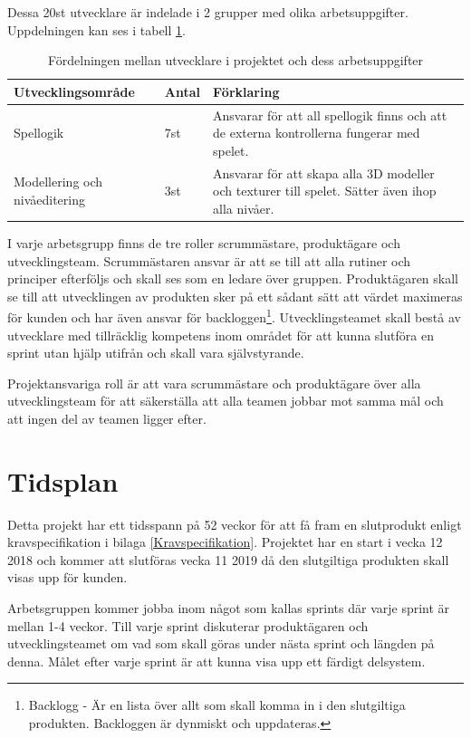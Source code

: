 \documentclass[a4paper,12pt,oneside,final]{extbook}
\begin{document}
Dessa 20st utvecklare är indelade i 2 grupper med olika arbetsuppgifter. Uppdelningen kan ses i tabell \ref{Utvecklare}.
\begin{table}[h]
	\centering
	\caption{Fördelningen mellan utvecklare i projektet och dess arbetsuppgifter}
	\label{Utvecklare}
	\begin{tabular}{ | p{10em} | m{3em} |p{23em}| } 
		\hline
		\textbf{Utvecklingsområde}&\textbf{Antal}  &\textbf{ Förklaring} \\ 
		\hline
		Spellogik &7st & Ansvarar för att all spellogik finns och att de externa kontrollerna fungerar med spelet. \\ 
		\hline
		Modellering och nivåeditering &3st & Ansvarar för att skapa alla 3D modeller och texturer till spelet. Sätter även ihop alla nivåer.  \\ 
		\hline
	
	\end{tabular}
\end{table}

I varje arbetsgrupp finns de tre roller scrummästare, produktägare och utvecklingsteam. Scrummästaren ansvar är att se till att alla rutiner och principer efterföljs och skall ses som en ledare över gruppen. Produktägaren skall se till att utvecklingen av produkten sker på ett sådant sätt att värdet maximeras för kunden och har även ansvar för backloggen\footnote{Backlogg - Är en lista över allt som skall komma in i den slutgiltiga produkten. Backloggen är dynmiskt och uppdateras. }. Utvecklingsteamet skall bestå av utvecklare med tillräcklig kompetens inom området för att kunna slutföra en sprint utan hjälp utifrån och skall vara självstyrande\cite{Scrumguiden}. 


Projektansvariga roll är att vara scrummästare och produktägare över alla utvecklingsteam för att säkerställa att alla teamen jobbar mot samma mål och att ingen del av teamen ligger efter.

\section{Tidsplan}
Detta projekt har ett tidsspann på 52 veckor för att få fram en slutprodukt enligt kravspecifikation i bilaga \ref{Kravspecifikation}. Projektet har en start i vecka 12 2018 och kommer att slutföras vecka 11 2019 då den slutgiltiga produkten skall visas upp för kunden. 

Arbetsgruppen kommer jobba inom något som kallas sprints där varje sprint är mellan 1-4 veckor. Till varje sprint diskuterar produktägaren och utvecklingsteamet om vad som skall göras under nästa sprint och längden på denna. Målet efter varje sprint är att kunna visa upp ett färdigt delsystem. 
\end{document}
